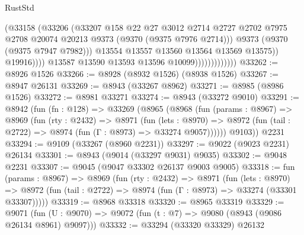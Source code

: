 \begin{lexlean}{RustStd}
\begin{coremodule}
                                        (@33158
                                          (@33206
                                            (@33207
                                              @158
                                              @22
                                              @27
                                              @3012
                                              @2714
                                              @2727
                                              @2702
                                              @7975
                                              @2708
                                              @20074
                                              @20213
                                              @9373
                                              (@9370 (@9375 @7976 @2714)))
                                            @9373
                                            (@9370 (@9375 @7947 @7982)))
                                          @13554
                                          @13557
                                          @13560
                                          @13564
                                          @13569
                                          @13575))
                                      @19916))))
                              @13587
                              @13590
                              @13593
                              @13596
                              @10099)))))))))))))
@33262 := @8926 @1526
@33266 := @8928 (@8932 @1526) (@8938 @1526)
@33267 := @8947 @26131
@33269 := @8943 (@33267 @8962)
@33271 := @8985 (@8986 @1526)
@33272 := @8981 @33271
@33274 := @8943 (@33272 @9010)
@33291 := @8942
    (fun (fn : @128) =>
    @33269
      (@8965
        (@8968
          (fun (params : @8967) =>
          @8969
            (fun (rty : @2432) =>
            @8971
              (fun (lets : @8970) =>
              @8972 (fun (tail : @2722) => @8974 (fun (Γ : @8973) => @33274 @9057))))))
        @9103))
    @2231
@33294 := @9109 (@33267 (@8960 @2231))
@33297 := @9022 (@9023 @2231) @26134
@33301 := @8943 (@9014 (@33297 @9031) @9035)
@33302 := @9048 @2231
@33307 := @9045 (@9047 @33302 @26137 @9003 @9005)
@33318 := fun (params : @8967) =>
  @8969
    (fun (rty : @2432) =>
    @8971
      (fun (lets : @8970) =>
      @8972 (fun (tail : @2722) => @8974 (fun (Γ : @8973) => @33274 (@33301 @33307)))))
@33319 := @8968 @33318
@33320 := @8965 @33319
@33329 := @9071
    (fun (U : @9070) => @9072 (fun (t : @7) => @9080 (@8943 (@9086 @26134 @8961) @9097)))
@33332 := @33294 (@33320 @33329) @26132

\end{coremodule}
\end{lexlean}
